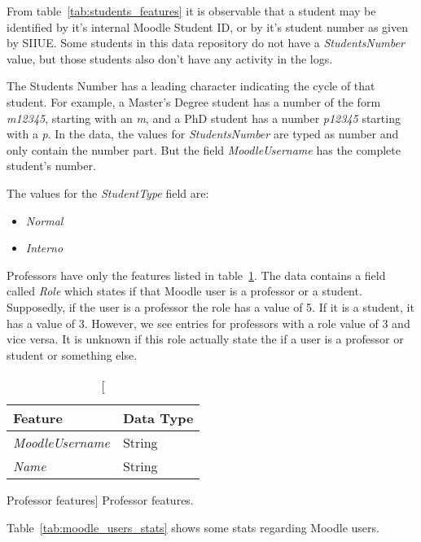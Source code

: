 From table~\ref{tab:students_features} it is observable that a student may be
identified by it's internal Moodle Student ID, or by it's student number as
given by SIIUE. Some students in this data repository do not have a
\textit{StudentsNumber} value, but those students also don't have any activity
in the logs.

The Students Number has a leading character indicating the cycle of that
student. For example, a Master's Degree student has a number of the form
\textit{m12345}, starting with an \textit{m}, and a PhD student has a number
\textit{p12345} starting with a \textit{p}. In the data, the values for
\textit{StudentsNumber} are typed as number and only contain the number part.
But the field \textit{MoodleUsername} has the complete student's number.

The values for the \textit{StudentType} field are:

\begin{itemize}
    \item \textit{Normal}
    \item \textit{Interno}
\end{itemize}

Professors have only the features listed in table~\ref{tab:professor_features}.
The data contains a field called \textit{Role} which states if that Moodle user
is a professor or a student. Supposedly, if the user is a professor the role
has a value of 5. If it is a student, it has a value of 3. However, we see
entries for professors with a role value of 3 and vice versa. It is unknown if
this role actually state the if a user is a professor or student or something
else.

\begin{table}[h!]
    \centering

    \begin{tabular}{l l}
        Feature                 & Data Type \\ \hline
        \textit{MoodleUsername} & String    \\
        \textit{Name}           & String    \\
    \end{tabular}

    \caption
        [Professor features]
        {Professor features.}

    \label{tab:professor_features}
\end{table}

Table~\ref{tab:moodle_users_stats} shows some stats regarding Moodle users.

